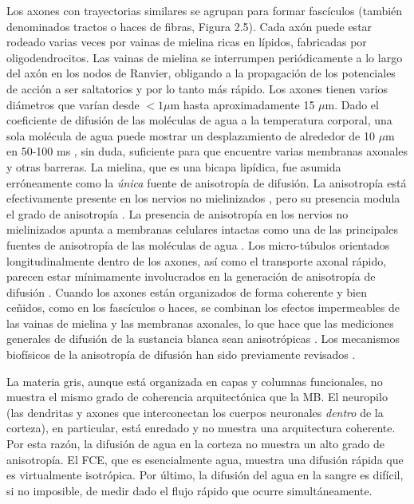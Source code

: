 \documentclass[12pt,a5,twoside]{book}
\begin{document}
Los axones con trayectorias similares se agrupan para formar fascículos (también denominados tractos o haces de fibras, Figura 2.5). Cada axón puede estar rodeado varias veces por vainas de mielina ricas en lípidos, fabricadas por oligodendrocitos. Las vainas de mielina se interrumpen periódicamente a lo largo del axón en los nodos de Ranvier, obligando a la propagación de los potenciales de acción a ser saltatorios y por lo tanto más rápido. Los axones tienen varios diámetros que varían desde $< 1 \mu$m hasta aproximadamente 15 \(\mu\)m. Dado el coeficiente de difusión de las moléculas de agua a la temperatura corporal, una sola molécula de agua puede mostrar un desplazamiento de alrededor de 10 \(\mu\)m en 50-100 ms \citep{Le_Bihan_2002}, sin duda, suficiente para que encuentre varias membranas axonales y otras barreras. La mielina, que es una bicapa lipídica, fue asumida erróneamente como la {\it única} fuente de anisotropía de difusión. La anisotropía está efectivamente presente en los nervios no mielinizados \citep{Beaulieu_1994,Gulani_2001}, pero su presencia modula el grado de anisotropía \citep{Gulani_2001,Tyszka_2006}. La presencia de anisotropía en los nervios no mielinizados apunta a membranas celulares intactas como una de las principales fuentes de anisotropía de las moléculas de agua \citep{Beaulieu_1994,Gulani_2001}. Los micro-túbulos orientados longitudinalmente dentro de los axones, así como el transporte axonal rápido, parecen estar mínimamente involucrados en la generación de anisotropía de difusión \citep{Beaulieu_1994}. Cuando los axones están organizados de forma coherente y bien ceñidos, como en los fascículos o haces, se combinan los efectos impermeables de las vainas de mielina y las membranas axonales, lo que hace que las mediciones generales de difusión de la sustancia blanca sean anisotrópicas \citep{Pierpaoli_1996,Beaulieu2002}. Los mecanismos biofísicos de la anisotropía de difusión han sido previamente revisados \citep{Beaulieu2002}.

La materia gris, aunque está organizada en capas y columnas funcionales, no muestra el mismo grado de coherencia arquitectónica que la MB. El neuropilo (las dendritas y axones que interconectan los cuerpos neuronales {\it dentro} de la corteza), en particular, está enredado y no muestra una arquitectura coherente. Por esta razón, la difusión de agua en la corteza no muestra un alto grado de anisotropía. El FCE, que es esencialmente agua, muestra una difusión rápida que es virtualmente isotrópica. Por último, la difusión del agua en la sangre es difícil, si no imposible, de medir dado el flujo rápido que ocurre simultáneamente.
\end{document}
